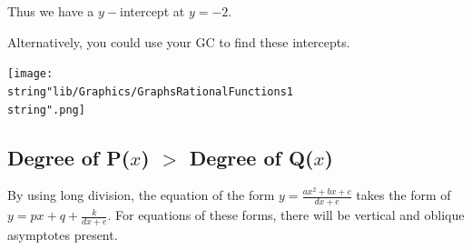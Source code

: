\documentclass[11pt,a4paper]{book}
\begin{document}
\begin{example}{}
Thus we have a $y-$intercept at $y=-2$.
\begin{flushright}
Alternatively, you could use your GC to find these intercepts.
\par\end{flushright}

\begin{center}
\texttt{[image: \\string"lib/Graphics/GraphsRationalFunctions1\\string".png]}
\par\end{center}

\end{example}

\newpage

\subsection{Degree of P($x$) $>$ Degree of Q($x$) }

By using long division, the equation of the form ${\displaystyle y=\frac{ax^{2}+bx+c}{dx+e}}$
takes the form of ${\displaystyle y=px+q+\frac{k}{dx+e}}$. For equations of these forms, there will be vertical and oblique asymptotes present.
\end{document}
